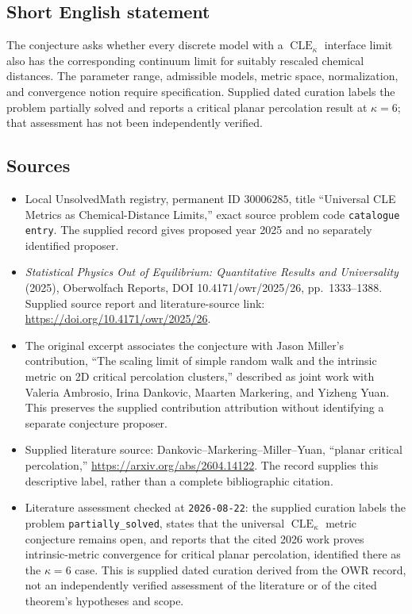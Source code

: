 \documentclass[11pt]{article}
\begin{document}
\subsection{Short English statement}
The conjecture asks whether every discrete model with a \(\operatorname{CLE}_{\kappa}\) interface limit also has the corresponding continuum limit for suitably rescaled chemical distances. The parameter range, admissible models, metric space, normalization, and convergence notion require specification. Supplied dated curation labels the problem partially solved and reports a critical planar percolation result at \(\kappa=6\); that assessment has not been independently verified.
\subsection{Sources}
\begin{itemize}
\item Local UnsolvedMath registry, permanent ID \(30006285\), title ``Universal CLE Metrics as Chemical-Distance Limits,'' exact source problem code \texttt{catalogue entry}. The supplied record gives proposed year 2025 and no separately identified proposer.
\item \emph{Statistical Physics Out of Equilibrium: Quantitative Results and Universality} (2025), Oberwolfach Reports, DOI 10.4171/owr/2025/26, pp.\ 1333--1388. Supplied source report and literature-source link: \url{https://doi.org/10.4171/owr/2025/26}.
\item The original excerpt associates the conjecture with Jason Miller's contribution, ``The scaling limit of simple random walk and the intrinsic metric on 2D critical percolation clusters,'' described as joint work with Valeria Ambrosio, Irina Dankovic, Maarten Markering, and Yizheng Yuan. This preserves the supplied contribution attribution without identifying a separate conjecture proposer.
\item Supplied literature source: Dankovic--Markering--Miller--Yuan, ``planar critical percolation,'' \url{https://arxiv.org/abs/2604.14122}. The record supplies this descriptive label, rather than a complete bibliographic citation.
\item Literature assessment checked at \texttt{2026-08-22}: the supplied curation labels the problem \texttt{partially\_solved}, states that the universal \(\operatorname{CLE}_{\kappa}\) metric conjecture remains open, and reports that the cited 2026 work proves intrinsic-metric convergence for critical planar percolation, identified there as the \(\kappa=6\) case. This is supplied dated curation derived from the OWR record, not an independently verified assessment of the literature or of the cited theorem's hypotheses and scope.
\end{itemize}
\end{document}
